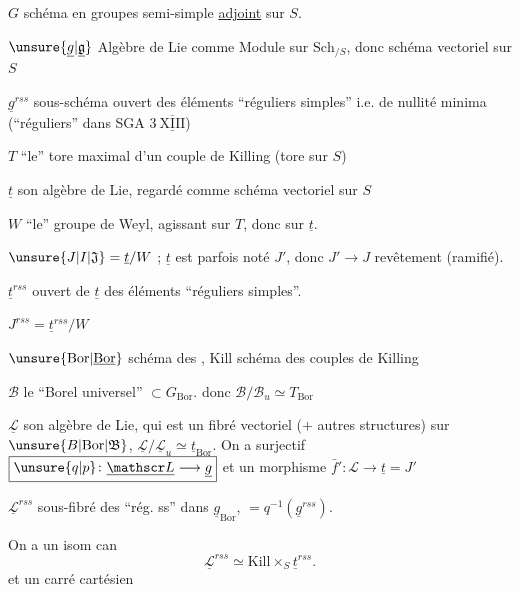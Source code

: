 $G$ schéma en groupes semi-simple \uline{adjoint} sur $S$.

$\unsure{\underline{g}|\underline{\mathfrak g}}$ Algèbre de Lie comme Module sur $\mathrm{Sch}_{/S}$, donc schéma vectoriel sur $S$

$\underline{g}^{rss}$ sous-schéma ouvert des éléments ``réguliers simples'' i.e. de nullité minima (``réguliers'' dans SGA $3\ \overline{\underline{\mathrm{XIII}}}$)

$T$ ``le'' tore maximal d'un couple de Killing (tore sur $S$)

$\underline t$ son algèbre de Lie, regardé comme schéma vectoriel sur $S$

$W$ ``le'' groupe de Weyl, agissant sur $T$, donc sur $\underline t$.

$\unsure{J|I|\mathfrak J}=\underline t/W$ ; $\underline t$ est parfois noté $J'$, donc $J'\longrightarrow J$ revêtement (ramifié).

$\underline t^{rss}$ ouvert de $\underline t$ des éléments ``réguliers simples''.


$J^{rss}=\underline t^{rss}/W$

$\unsure{\mathrm{Bor}|\underline{\mathrm{Bor}}}$ schéma des ,  $\mathrm{Kill}$ schéma des couples de Killing

$\mathscr B$ le ``Borel universel'' $\subset G_{\mathrm{Bor}}$. donc $\mathscr B/\mathscr B_u\simeq T_{\mathrm{Bor}}$

$\underline{\mathscr L}$ son algèbre de Lie, qui est un fibré vectoriel ($+$ autres structures) sur $\unsure{B|\mathrm{Bor}|\mathfrak B}$, $\underline{\mathscr L}/\underline{\mathscr L}_u\simeq\underline t_{\mathrm{Bor}}$. On a  surjectif $\boxed{\unsure{q|p}\colon\underline{\mathscr L}\longrightarrow\underline g}$ et un morphisme $\boxed{\bar f'\colon\mathscr L\longrightarrow\underline t=J'}$

$\underline{\mathscr L}^{rss}$ sous-fibré des  ``rég. ss'' dans $\underline g_{\mathrm{Bor}}$,
$=q^{-1}(\underline g^{rss})$.

On a un isom can
\[
\underline{\mathscr L}^{rss}\simeq \mathrm{Kill}\times_S\underline t^{rss}.
\]
et un carré cartésien

